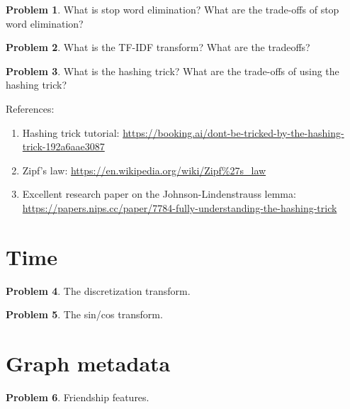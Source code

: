 \documentclass[10pt]{article}
\theoremstyle{definition}
\newtheorem{problem}{Problem}
\begin{document}
\newpage
\begin{problem}
    What is stop word elimination?
    What are the trade-offs of stop word elimination?
\end{problem}

\newpage
\begin{problem}
    What is the TF-IDF transform?
    What are the tradeoffs?
\end{problem}

\newpage
\begin{problem}
    What is the hashing trick?
    What are the trade-offs of using the hashing trick?

    \noindent
    References:
    \begin{enumerate}
        \item Hashing trick tutorial: \url{https://booking.ai/dont-be-tricked-by-the-hashing-trick-192a6aae3087}
        \item Zipf's law: \url{https://en.wikipedia.org/wiki/Zipf%27s_law}

        \item Excellent research paper on the Johnson-Lindenstrauss lemma: \url{https://papers.nips.cc/paper/7784-fully-understanding-the-hashing-trick}
    \end{enumerate}
\end{problem}



\newpage
\section{Time}
\begin{problem}
    The discretization transform.
\end{problem}

\newpage
\begin{problem}
    The sin/cos transform.
\end{problem}


\newpage
\section{Graph metadata}
\begin{problem}
    Friendship features.
\end{problem}
\end{document}
